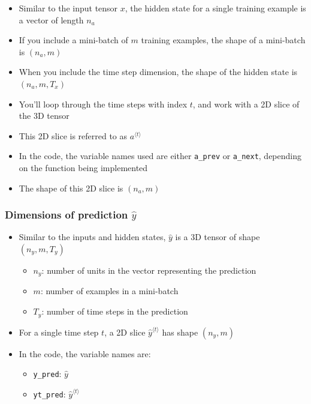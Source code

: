 \documentclass[11pt]{article}
\providecommand{\tightlist}{%
      \setlength{\itemsep}{0pt}\setlength{\parskip}{0pt}}
\begin{document}
\begin{itemize}
\tightlist
\item
  Similar to the input tensor \(x\), the hidden state for a single
  training example is a vector of length \(n_{a}\)
\item
  If you include a mini-batch of \(m\) training examples, the shape of a
  mini-batch is \((n_{a},m)\)
\item
  When you include the time step dimension, the shape of the hidden
  state is \((n_{a}, m, T_x)\)
\item
  You'll loop through the time steps with index \(t\), and work with a
  2D slice of the 3D tensor\\
\item
  This 2D slice is referred to as \(a^{\langle t \rangle}\)
\item
  In the code, the variable names used are either \texttt{a\_prev} or
  \texttt{a\_next}, depending on the function being implemented
\item
  The shape of this 2D slice is \((n_{a}, m)\)
\end{itemize}

    \hypertarget{dimensions-of-prediction-haty}{%
\subsubsection{\texorpdfstring{Dimensions of prediction
\(\hat{y}\)}{Dimensions of prediction \textbackslash hat\{y\}}}\label{dimensions-of-prediction-haty}}

\begin{itemize}
\tightlist
\item
  Similar to the inputs and hidden states, \(\hat{y}\) is a 3D tensor of
  shape \((n_{y}, m, T_{y})\)

  \begin{itemize}
  \tightlist
  \item
    \(n_{y}\): number of units in the vector representing the prediction
  \item
    \(m\): number of examples in a mini-batch
  \item
    \(T_{y}\): number of time steps in the prediction
  \end{itemize}
\item
  For a single time step \(t\), a 2D slice
  \(\hat{y}^{\langle t \rangle}\) has shape \((n_{y}, m)\)
\item
  In the code, the variable names are:

  \begin{itemize}
  \tightlist
  \item
    \texttt{y\_pred}: \(\hat{y}\)
  \item
    \texttt{yt\_pred}: \(\hat{y}^{\langle t \rangle}\)
  \end{itemize}
\end{itemize}
\end{document}
